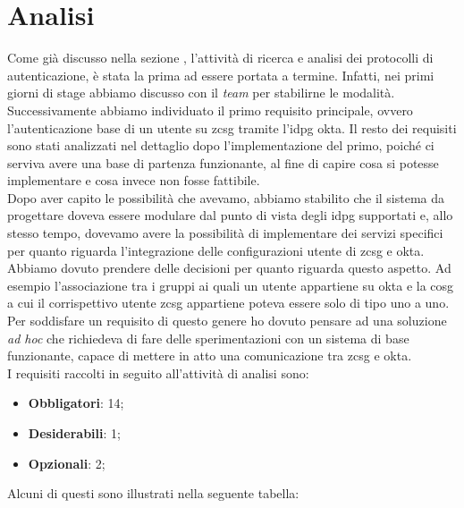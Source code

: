 \section{Analisi}\label{sec:requisiti}
Come già discusso nella sezione , l'attività di ricerca e analisi dei protocolli di autenticazione, è stata la prima ad essere portata a termine. Infatti, nei primi giorni di stage abbiamo discusso con il \textit{team} per stabilirne le modalità. Successivamente abbiamo individuato il primo requisito principale, ovvero l'autenticazione base di un utente su \gls{zcsg} tramite l'\gls{idpg} \gls{okta}. Il resto dei requisiti sono stati analizzati nel dettaglio dopo l'implementazione del primo, poiché ci serviva avere una base di partenza funzionante, al fine di capire cosa si potesse implementare e cosa invece non fosse fattibile. \\
Dopo aver capito le possibilità che avevamo, abbiamo stabilito che il sistema da progettare doveva essere modulare dal punto di vista degli \gls{idpg} supportati e, allo stesso tempo, dovevamo avere la possibilità di implementare dei servizi specifici per quanto riguarda l'integrazione delle configurazioni utente di \gls{zcsg} e \gls{okta}. Abbiamo dovuto prendere delle decisioni per quanto riguarda questo aspetto. Ad esempio l'associazione tra i gruppi ai quali un utente appartiene su \gls{okta} e la \gls{cosg} a cui il corrispettivo utente \gls{zcsg} appartiene poteva essere solo di tipo uno a uno. Per soddisfare un requisito di questo genere ho dovuto pensare ad una soluzione \textit{ad hoc} che richiedeva di fare delle sperimentazioni con un sistema di base funzionante, capace di mettere in atto una comunicazione tra \gls{zcsg} e \gls{okta}. \\
I requisiti raccolti in seguito all'attività di analisi sono:
\begin{itemize}
    \setlength\itemsep{0em}
    \item \textbf{Obbligatori}: 14;
    \item \textbf{Desiderabili}: 1;
    \item \textbf{Opzionali}: 2;
\end{itemize}
 
Alcuni di questi sono illustrati nella seguente tabella:

\newpage

